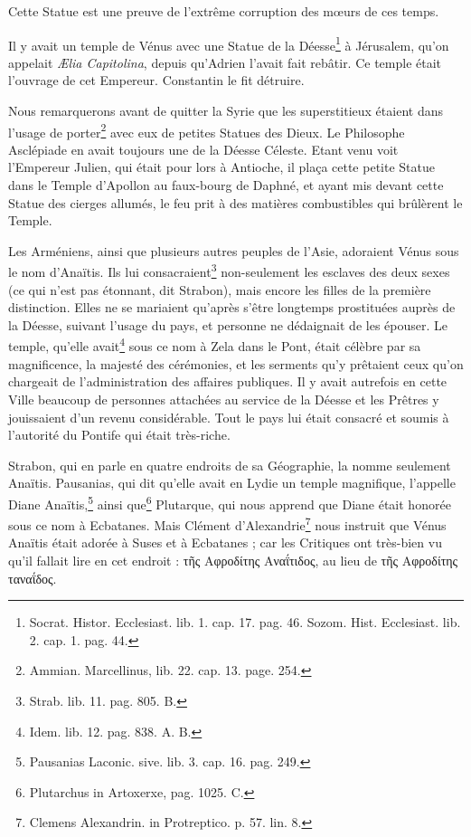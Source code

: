 \documentclass[a4paper, 11pt, oneside, polutonikogreek, french]{article}
\begin{document}
Cette Statue est une preuve de l'extrême corruption des mœurs de ces temps.

Il y avait un temple de Vénus avec une Statue de la Déesse\footnote{Socrat. Histor. Ecclesiast. lib. 1. cap. 17. pag. 46. Sozom. Hist. Ecclesiast. lib. 2. cap. 1. pag. 44.} à Jérusalem, qu'on appelait \emph{Ælia Capitolina}, depuis qu'Adrien l'avait fait rebâtir. Ce temple était l'ouvrage de cet Empereur. Constantin le fit détruire.

Nous remarquerons avant de quitter la Syrie que les superstitieux étaient dans l'usage de porter\footnote{Ammian. Marcellinus, lib. 22. cap. 13. page. 254.} avec eux de petites Statues des Dieux. Le Philosophe Asclépiade en avait toujours une de la Déesse Céleste. Etant venu voit l'Empereur Julien, qui était pour lors à Antioche, il plaça cette petite Statue dans le Temple d'Apollon au faux-bourg de Daphné, et ayant mis devant cette Statue des cierges allumés, le feu prit à des matières combustibles qui brûlèrent le Temple.

Les Arméniens, ainsi que plusieurs autres peuples de l'Asie, adoraient Vénus sous le nom d'Anaïtis. Ils lui consacraient\footnote{Strab. lib. 11. pag. 805. B.} non-seulement les esclaves des deux sexes (ce qui n'est pas étonnant, dit Strabon), mais encore les filles de la première distinction. Elles ne se mariaient qu'après s'être longtemps prostituées auprès de la Déesse, suivant l'usage du pays, et personne ne dédaignait de les épouser. Le temple, qu'elle avait\footnote{Idem. lib. 12. pag. 838. A. B.} sous ce nom à Zela dans le Pont, était célèbre par sa magnificence, la majesté des cérémonies, et les serments qu'y prêtaient ceux qu'on chargeait de l'administration des affaires publiques. Il y avait autrefois en cette Ville beaucoup de personnes attachées au service de la Déesse et les Prêtres y jouissaient d'un revenu considérable. Tout le pays lui était consacré et soumis à l'autorité du Pontife qui était très-riche.

Strabon, qui en parle en quatre endroits de sa Géographie, la nomme seulement Anaïtis. Pausanias, qui dit qu'elle avait en Lydie un temple magnifique, l'appelle Diane Anaïtis,\footnote{Pausanias Laconic. sive. lib. 3. cap. 16. pag. 249.} ainsi que\footnote{Plutarchus in Artoxerxe, pag. 1025. C.} Plutarque, qui nous apprend que Diane était honorée sous ce nom à Ecbatanes. Mais Clément d'Alexandrie\footnote{Clemens Alexandrin. in Protreptico. p. 57. lin. 8.} nous instruit que Vénus Anaïtis était adorée à Suses et à Ecbatanes ; car les Critiques ont très-bien vu qu'il fallait lire en cet endroit : τῆς Αφροδίτης Αναΐτιδος, au lieu de τῆς Αφροδίτης ταναΐδος.
\end{document}
